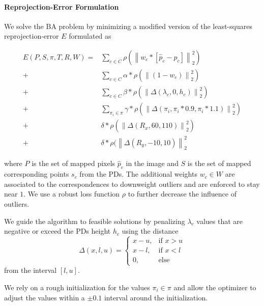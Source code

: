 \paragraph{Reprojection-Error Formulation}
\label{sec:static_calibration_rerpojection_error}
We solve the BA problem by minimizing a modified version of the least-squares reprojection-error $E$ formulated as

\begin{equation}
  \begin{split}
  E(P, S, \pi, T, R, W ) =& 
  \sum_{c \in C} 
  \rho(\left\lVert 
    w_c * [ \hat{p}_c - p_c ]
  \right\rVert^2_2) \\ 
  +& 
  \sum_{c \in C} 
  \alpha * 
  \rho(\left\lVert 
  (1 - w_c)
  \right\rVert^2_2) \\ 
  +& 
  \sum_{c \in C} 
  \beta * 
  \rho(\left\lVert 
  \Delta(\lambda_c, 0, h_c)
  \right\rVert^2_2) \\ 
  +& 
  \sum_{\pi_i \in \pi} 
  \gamma *
  \rho(\left\lVert 
  \Delta (\pi_i, \pi_i * 0.9, \pi_i * 1.1)
  \right\rVert^2_2) \\
  +&
  \delta * 
  \rho(\left\lVert 
  \Delta (R_x, 60, 110)
  \right\rVert^2_2) \\
  +&
  \delta * 
  \rho(\left\lVert 
  \Delta (R_y, -10, 10)
  \right\rVert^2_2 
\end{split}
\label{eq:static_calibration_rerpojection_error}
\end{equation}

where $P$ is the set of mapped pixels $\hat{p}_c$ in the image and $S$ is the set of mapped corresponding points $s_c$ from the PDs.  
The additional weights $w_c \in W$ are associated to the correspondences to downweight outliers and are enforced to stay near $1$.
We use a robust loss function $\rho$ to further decrease the influence of outliers.

We guide the algorithm to feasible solutions by penalizing $\lambda_c$ values that are negative or exceed the PDs height $h_c$ using the distance 
\begin{equation}
    \Delta (x, l, u) =
    \begin{cases}
      x - u,& \text{if } x > u\\
      x - l,& \text{if } x < l\\
      0,    & \text{else}
    \end{cases} 
\end{equation}
from the interval $[l, u]$.

We rely on a rough initialization for the values $\pi_i \in \pi$ and allow the optimizer to adjust the values within a $\pm 0.1$ interval around the initialization. 

